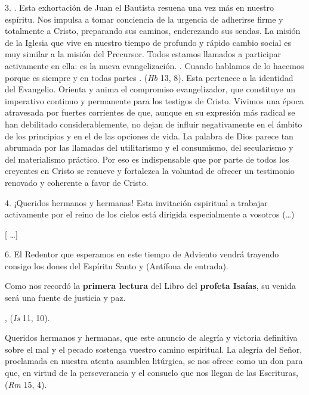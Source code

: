 \begin{body}
					3. . Esta exhortación de Juan el Bautista resuena una vez más en nuestro espíritu. Nos impulsa a tomar conciencia de la urgencia de adherirse firme y totalmente a Cristo, preparando sus caminos, enderezando sus sendas. La misión de la Iglesia que vive en nuestro tiempo de profundo y rápido cambio social es muy similar a la misión del Precursor. Todos estamos llamados a participar activamente en ella: es la nueva evangelización. . Cuando hablamos de  lo hacemos porque es siempre y en todas partes .  (\emph{Hb} 13, 8). Esta  pertenece a la identidad del Evangelio. Orienta y anima el compromiso evangelizador, que constituye un imperativo continuo y permanente para los testigos de Cristo. Vivimos una época atravesada por fuertes corrientes de  que, aunque en su expresión más radical se han debilitado considerablemente, no dejan de influir negativamente en el ámbito de los principios y en el de las opciones de vida. La palabra de Dios parece tan abrumada por las llamadas del utilitarismo y el consumismo, del secularismo y del materialismo práctico. Por eso es indispensable que por parte de todos los creyentes en Cristo se renueve y fortalezca la voluntad de ofrecer un testimonio renovado y coherente a favor de Cristo.
					
					4. ¡Queridos hermanos y hermanas! Esta invitación espiritual a trabajar activamente por el reino de los cielos está dirigida especialmente a vosotros (\ldots{})
					
					{[} \ldots{}{]}
					
					6. El Redentor que esperamos en este tiempo de Adviento vendrá trayendo consigo los dones del Espíritu Santo y  (Antífona de entrada).
					
					Como nos recordó la \textbf{primera lectura} del Libro del \textbf{profeta Isaías}, su venida será una fuente de justicia y paz.
					
					,  (\emph{Is} 11, 10). 
					
					Queridos hermanos y hermanas, que este anuncio de alegría y victoria definitiva sobre el mal y el pecado sostenga vuestro camino espiritual. La alegría del Señor, proclamada en nuestra atenta asamblea litúrgica, se nos ofrece como un don para que, en virtud de la perseverancia y el consuelo que nos llegan de las Escrituras,  (\emph{Rm} 15, 4). 
					

\end{body}
